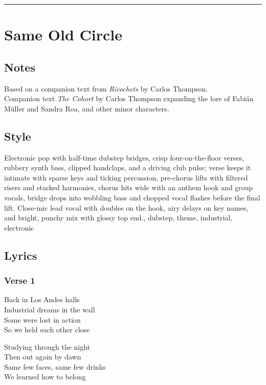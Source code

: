 \begin{center}\rule{0.5\linewidth}{0.5pt}\end{center}

\section{Same Old Circle}\label{same-old-circle}

\subsection{Notes}\label{notes-16}

Based on a companion text from \emph{Ricochets} by Carlos Thompson.\\
Companion text \emph{The Cohort} by Carlos Thompson expanding the lore
of Fabián Müller and Sandra Roa, and other minor characters.

\subsection{Style}\label{style-16}

Electronic pop with half-time dubstep bridges, crisp four-on-the-floor
verses, rubbery synth bass, clipped handclaps, and a driving club pulse;
verse keeps it intimate with sparse keys and ticking percussion,
pre-chorus lifts with filtered risers and stacked harmonies, chorus hits
wide with an anthem hook and group vocals, bridge drops into wobbling
bass and chopped vocal flashes before the final lift. Close-mic lead
vocal with doubles on the hook, airy delays on key names, and bright,
punchy mix with glossy top end., dubstep, theme, industrial, electronic

\subsection{Lyrics}\label{lyrics-16}

\subsubsection{Verse 1}\label{verse-1-12}

Back in Los Andes halls\\
Industrial dreams in the wall\\
Some were lost in action\\
So we held each other close

Studying through the night\\
Then out again by dawn\\
Same few faces, same few drinks\\
We learned how to belong

